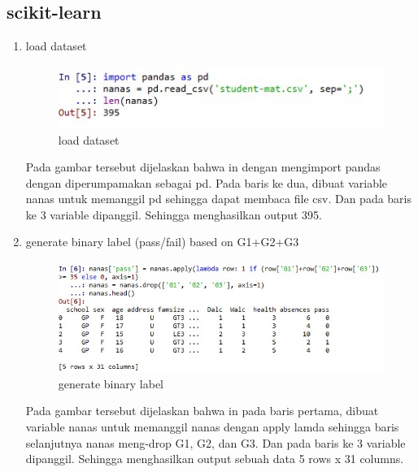 \subsection{scikit-learn}
\begin{enumerate}

\item load dataset 
\begin{figure}
\centering
\includegraphics[scale=0.9]{figures/g1.jpg}
\caption{load dataset}
\label{contoh}
\end{figure}
\par Pada gambar tersebut dijelaskan bahwa in dengan mengimport pandas dengan diperumpamakan sebagai pd. Pada baris ke dua, dibuat variable nanas untuk memanggil pd sehingga dapat membaca file csv. Dan pada baris ke 3 variable dipanggil. Sehingga menghasilkan output 395. 

\item generate binary label (pass/fail) based on G1+G2+G3 
\begin{figure}
\centering
\includegraphics[scale=0.5]{figures/g2.jpg}
\caption{generate binary label}
\label{contoh}
\end{figure}
\par Pada gambar tersebut dijelaskan bahwa in pada baris pertama, dibuat variable nanas untuk memanggil nanas dengan apply lamda sehingga baris selanjutnya nanas meng-drop G1, G2, dan G3. Dan pada baris ke 3 variable dipanggil. Sehingga menghasilkan output sebuah data 5 rows x 31 columns.


\end{enumerate}
